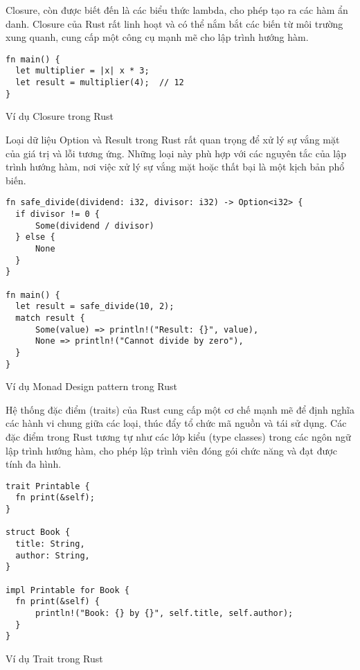 Closure, còn được biết đến là các biểu thức lambda, cho phép tạo ra các hàm ẩn danh. Closure của Rust rất linh hoạt và có thể nắm bắt các biến từ môi trường xung quanh, cung cấp một công cụ mạnh mẽ cho lập trình hướng hàm.

\begin{listing}[H]
\begin{verbatim}
fn main() {
  let multiplier = |x| x * 3;
  let result = multiplier(4);  // 12
}
\end{verbatim}
\caption{Ví dụ Closure trong Rust}
\label{code:fp_closure}
\end{listing}

Loại dữ liệu Option và Result trong Rust rất quan trọng để xử lý sự vắng mặt của giá trị và lỗi tương ứng. Những loại này phù hợp với các nguyên tắc của lập trình hướng hàm, nơi việc xử lý sự vắng mặt hoặc thất bại là một kịch bản phổ biến.

\begin{listing}[H]
\begin{verbatim}
fn safe_divide(dividend: i32, divisor: i32) -> Option<i32> {
  if divisor != 0 {
      Some(dividend / divisor)
  } else {
      None
  }
}

fn main() {
  let result = safe_divide(10, 2);
  match result {
      Some(value) => println!("Result: {}", value),
      None => println!("Cannot divide by zero"),
  }
}
\end{verbatim}
\caption{Ví dụ Monad Design pattern trong Rust}
\label{code:fp_monad}
\end{listing}

Hệ thống đặc điểm (traits) của Rust cung cấp một cơ chế mạnh mẽ để định nghĩa các hành vi chung giữa các loại, thúc đẩy tổ chức mã nguồn và tái sử dụng. Các đặc điểm trong Rust tương tự như các lớp kiểu (type classes) trong các ngôn ngữ lập trình hướng hàm, cho phép lập trình viên đóng gói chức năng và đạt được tính đa hình.

\begin{listing}[H]
\begin{verbatim}
trait Printable {
  fn print(&self);
}

struct Book {
  title: String,
  author: String,
}

impl Printable for Book {
  fn print(&self) {
      println!("Book: {} by {}", self.title, self.author);
  }
}
\end{verbatim}
\caption{Ví dụ Trait trong Rust}
\label{code:fp_trait}
\end{listing}

